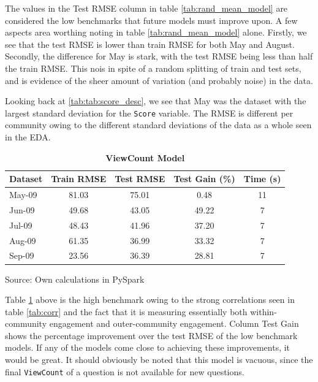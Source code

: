 \documentclass[11pt,preprint, authoryear]{article}
\numberwithin{equation}{section}
\begin{document}
\normalsize

The values in the Test RMSE column in table \ref{tab:rand_mean_model}
are considered the low benchmarks that future models must improve upon.
A few aspects area worthing noting in table \ref{tab:rand_mean_model}
alone. Firstly, we see that the test RMSE is lower than train RMSE for
both May and August. Secondly, the difference for May is stark, with the
test RMSE being less than half the train RMSE. This nois in spite of a
random splitting of train and test sets, and is evidence of the sheer
amount of variation (and probably noise) in the data.

Looking back at \ref{tab:tab:score_desc}, we see that May was the
dataset with the largest standard deviation for the \texttt{Score}
variable. The RMSE is different per community owing to the different
standard deviations of the data as a whole seen in the EDA.

\footnotesize

\begin{longtable}[htbp] {@{} lcccc @{}} 
\caption{\textbf{ViewCount Model}} 
\label{tab:rand_view_model} \\
\toprule
\textbf{Dataset} &  \textbf{Train RMSE} &  \textbf{Test RMSE} &  \textbf{Test Gain (\%)} &  \textbf{Time (s)} \\
\midrule
May-09 &                81.03 &             75.01 &               0.48 &               11 \\
Jun-09 &                49.68 &             43.05 &              49.22 &                7 \\
Jul-09 &                48.43 &             41.96 &              37.20 &                7 \\
Aug-09 &                61.35 &             36.99 &              33.32 &                7 \\
Sep-09 &                23.56 &             36.39 &              28.81 &                7 \\
\bottomrule
\end{longtable}\begin{center} Source: Own calculations in PySpark\end{center}

\normalsize

Table \ref{tab:rand_view_model} above is the high benchmark owing to the
strong correlations seen in table \ref{tab:corr} and the fact that it is
measuring essentially both within-community engagement and
outer-community engagement. Column Test Gain shows the percentage
improvement over the test RMSE of the low benchmark models. If any of
the models come close to achieving these improvements, it would be
great. It should obviously be noted that this model is vacuous, since
the final \texttt{ViewCount} of a question is not available for new
questions.
\end{document}

